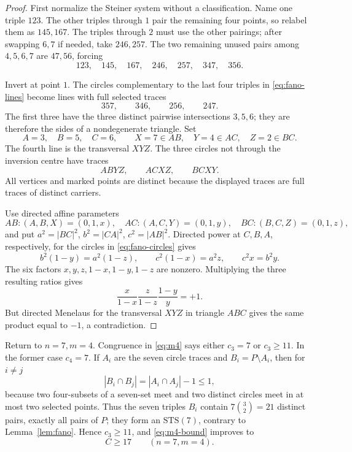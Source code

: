 \documentclass[11pt]{article}
\theoremstyle{definition}
\theoremstyle{remark}
\begin{document}
\begin{proof}
First normalize the Steiner system without a classification.  Name one
triple \(123\).  The other triples through \(1\) pair the remaining four
points, so relabel them as \(145,167\).  The triples through \(2\) must use
the other pairings; after swapping \(6,7\) if needed, take \(246,257\).
The two remaining unused pairs among \(4,5,6,7\) are \(47,56\), forcing
\begin{equation}\label{eq:fano-lines}
 123,\quad145,\quad167,\quad246,\quad257,\quad347,\quad356.
\end{equation}

Invert at point \(1\).  The circles complementary to the last four triples
in \eqref{eq:fano-lines} become lines with full selected traces
\[
 357,\qquad346,\qquad256,\qquad247.
\]
The first three have the three distinct pairwise intersections \(3,5,6\);
they are therefore the sides of a nondegenerate triangle.  Set
\[
 A=3,\quad B=5,\quad C=6,\qquad
 X=7\in AB,\quad Y=4\in AC,\quad Z=2\in BC.
\]
The fourth line is the transversal \(XYZ\).  The three circles not through
the inversion centre have traces
\begin{equation}\label{eq:fano-circles}
 ABYZ,\qquad ACXZ,\qquad BCXY.
\end{equation}
All vertices and marked points are distinct because the displayed traces
are full traces of distinct carriers.

Use directed affine parameters
\[
 AB:(A,B,X)=(0,1,x),\quad
 AC:(A,C,Y)=(0,1,y),\quad
 BC:(B,C,Z)=(0,1,z),
\]
and put \(a^2=|BC|^2\), \(b^2=|CA|^2\), \(c^2=|AB|^2\).
Directed power at \(C,B,A\), respectively, for the circles in
\eqref{eq:fano-circles} gives
\[
 b^2(1-y)=a^2(1-z),\qquad
 c^2(1-x)=a^2z,\qquad
 c^2x=b^2y.
\]
The six factors \(x,y,z,1-x,1-y,1-z\) are nonzero.  Multiplying the three
resulting ratios gives
\begin{equation}\label{eq:fano-plus}
 \frac{x}{1-x}\frac{z}{1-z}\frac{1-y}{y}=+1.
\end{equation}
But directed Menelaus for the transversal \(XYZ\) in triangle \(ABC\)
gives the same product equal to \(-1\), a contradiction.
\end{proof}

Return to \(n=7,m=4\).  Congruence in \eqref{eq:m4} says either
\(c_3=7\) or \(c_3\geq11\).  In the former case \(c_4=7\).  If \(A_i\) are
the seven circle traces and \(B_i=P\setminus A_i\), then for \(i\neq j\)
\[
 |B_i\cap B_j|=|A_i\cap A_j|-1\leq1,
\]
because two four-subsets of a seven-set meet and two distinct circles meet
in at most two selected points.  Thus the seven triples \(B_i\) contain
\(7\binom32=21\) distinct pairs, exactly all pairs of \(P\); they form an
\(\mathrm{STS}(7)\), contrary to Lemma~\ref{lem:fano}.  Hence
\(c_3\geq11\), and \eqref{eq:m4-bound} improves to
\begin{equation}\label{eq:fano-jump}
 C\geq17\qquad(n=7,m=4).
\end{equation}
\end{document}

